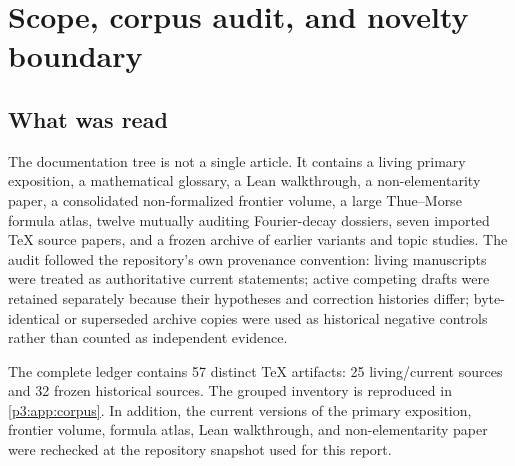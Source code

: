 \documentclass[11pt,oneside]{article}
\numberwithin{equation}{section}
\theoremstyle{definition}
\theoremstyle{remark}
\begin{document}
\begin{abstract}
Finally, substituting the repository's Gaussian-$q$-binomial--Thue--Morse formula for every dyadic weight yields finite identities equating $q$-binomial digital sums to Bell-polynomial moments.  Transport through the inverse Fabius function gives a rational quadrature family for the nonlinear quantile class $p(2F^{-1}(t)-1)$.  The report closes with conjectures on exact superconvergent precision, the next alias layer, denominator valuations, Appell zero geometry, Lambert-$W$ endpoint sum rules, multidimensional cubature, and Lean formalization.
\end{abstract}


\clearpage

\section{Scope, corpus audit, and novelty boundary}
\label{p3:sec:scope}

\subsection{What was read}

The documentation tree is not a single article.  It contains a living primary exposition, a mathematical glossary, a Lean walkthrough, a non-elementarity paper, a consolidated non-formalized frontier volume, a large Thue--Morse formula atlas, twelve mutually auditing Fourier-decay dossiers, seven imported TeX source papers, and a frozen archive of earlier variants and topic studies.  The audit followed the repository's own provenance convention: living manuscripts were treated as authoritative current statements; active competing drafts were retained separately because their hypotheses and correction histories differ; byte-identical or superseded archive copies were used as historical negative controls rather than counted as independent evidence.

The complete ledger contains 57 distinct TeX artifacts: 25 living/current sources and 32 frozen historical sources.  The grouped inventory is reproduced in \cref{p3:app:corpus}.  In addition, the current versions of the primary exposition, frontier volume, formula atlas, Lean walkthrough, and non-elementarity paper were rechecked at the repository snapshot used for this report.
\end{document}
